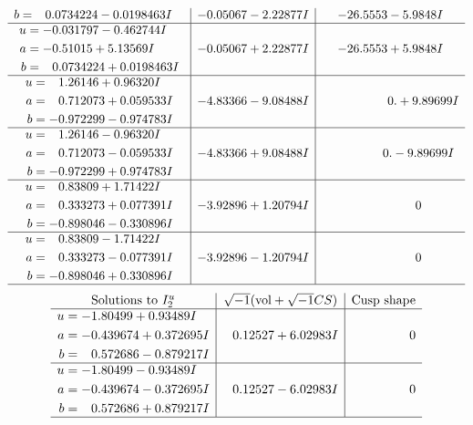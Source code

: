 \documentclass[1p]{elsarticle_modified}
\theoremstyle{definition}
\newcommand{\I}{\sqrt{-1}}
\begin{document}
$$\begin{array}{c|c|c}
\begin{aligned}
b &= \phantom{-}0.0734224 - 0.0198463 I\end{aligned}
 & -0.05067 - 2.22877 I & -26.5553 - 5.9848 I \\ \hline\begin{aligned}
u &= -0.031797 - 0.462744 I \\
a &= -0.51015 + 5.13569 I \\
b &= \phantom{-}0.0734224 + 0.0198463 I\end{aligned}
 & -0.05067 + 2.22877 I & -26.5553 + 5.9848 I \\ \hline\begin{aligned}
u &= \phantom{-}1.26146 + 0.96320 I \\
a &= \phantom{-}0.712073 + 0.059533 I \\
b &= -0.972299 - 0.974783 I\end{aligned}
 & -4.83366 - 9.08488 I & \phantom{-0.000000 -}0. + 9.89699 I \\ \hline\begin{aligned}
u &= \phantom{-}1.26146 - 0.96320 I \\
a &= \phantom{-}0.712073 - 0.059533 I \\
b &= -0.972299 + 0.974783 I\end{aligned}
 & -4.83366 + 9.08488 I & \phantom{-0.000000 } 0. - 9.89699 I \\ \hline\begin{aligned}
u &= \phantom{-}0.83809 + 1.71422 I \\
a &= \phantom{-}0.333273 + 0.077391 I \\
b &= -0.898046 - 0.330896 I\end{aligned}
 & -3.92896 + 1.20794 I & \phantom{-0.000000 } 0 \\ \hline\begin{aligned}
u &= \phantom{-}0.83809 - 1.71422 I \\
a &= \phantom{-}0.333273 - 0.077391 I \\
b &= -0.898046 + 0.330896 I\end{aligned}
 & -3.92896 - 1.20794 I & \phantom{-0.000000 } 0\\
 \hline 
 \end{array}$$\newpage$$\begin{array}{c|c|c}  
\text{Solutions to }I^u_{2}& \I (\text{vol} + \sqrt{-1}CS) & \text{Cusp shape}\\
 \hline 
\begin{aligned}
u &= -1.80499 + 0.93489 I \\
a &= -0.439674 + 0.372695 I \\
b &= \phantom{-}0.572686 - 0.879217 I\end{aligned}
 & \phantom{-}0.12527 + 6.02983 I & \phantom{-0.000000 } 0 \\ \hline\begin{aligned}
u &= -1.80499 - 0.93489 I \\
a &= -0.439674 - 0.372695 I \\
b &= \phantom{-}0.572686 + 0.879217 I\end{aligned}
 & \phantom{-}0.12527 - 6.02983 I & \phantom{-0.000000 } 0\\
 \hline 
 \end{array}$$\newpage\newpage\renewcommand{\arraystretch}{1}
\end{document}
